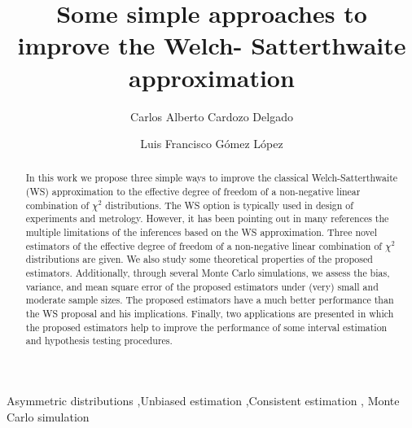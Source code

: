\documentclass[
  authoryear,
  preprint,
  3p]{elsarticle}
\begin{document}
\begin{frontmatter}
\title{Some simple approaches to improve the Welch- Satterthwaite
approximation}
\author[1]{Carlos Alberto Cardozo Delgado%
%
}
\author[2]{Luis Francisco Gómez López%
%
}


        
\begin{abstract}
In this work we propose three simple ways to improve the classical
Welch-Satterthwaite (WS) approximation to the effective degree of
freedom of a non-negative linear combination of \(\chi^2\)
distributions. The WS option is typically used in design of experiments
and metrology. However, it has been pointing out in many references the
multiple limitations of the inferences based on the WS approximation.
Three novel estimators of the effective degree of freedom of a
non-negative linear combination of \(\chi^2\) distributions are given.
We also study some theoretical properties of the proposed estimators.
Additionally, through several Monte Carlo simulations, we assess the
bias, variance, and mean square error of the proposed estimators under
(very) small and moderate sample sizes. The proposed estimators have a
much better performance than the WS proposal and his implications.
Finally, two applications are presented in which the proposed estimators
help to improve the performance of some interval estimation and
hypothesis testing procedures.
\end{abstract}





\begin{keyword}
    Asymmetric distributions \sep Unbiased estimation \sep Consistent
estimation \sep 
    Monte Carlo simulation
\end{keyword}
\end{frontmatter}
    
\end{document}

